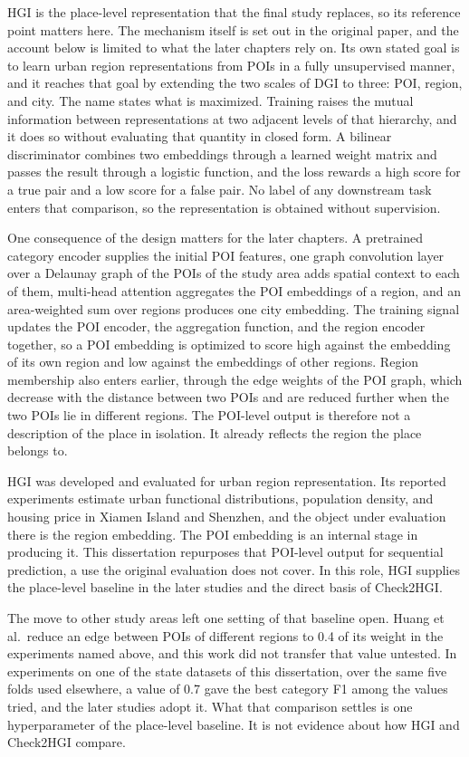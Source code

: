 HGI is the place-level representation that the final study replaces, so its reference
point matters here. The mechanism itself is set out in the original paper, and the
account below is limited to what the later chapters rely on. Its own stated goal is to
learn urban region representations from POIs in a fully unsupervised manner, and it
reaches that goal by extending the two scales of DGI to three: POI, region, and city.
The name states what is maximized. Training raises the mutual information between
representations at two adjacent levels of that hierarchy, and it does so without
evaluating that quantity in closed form. A bilinear discriminator combines two
embeddings through a learned weight matrix and passes the result through a logistic
function, and the loss rewards a high score for a true pair and a low score for a
false pair. No label of any downstream task enters that comparison, so the
representation is obtained without supervision.

One consequence of the design matters for the later chapters. A pretrained category
encoder supplies the initial POI features, one graph convolution layer over a Delaunay
graph of the POIs of the study area adds spatial context to each of them, multi-head
attention aggregates the POI embeddings of a region, and an area-weighted sum over
regions produces one city embedding. The training signal updates the POI encoder, the
aggregation function, and the region encoder together, so a POI embedding is optimized
to score high against the embedding of its own region and low against the embeddings
of other regions. Region membership also enters earlier, through the edge weights of
the POI graph, which decrease with the distance between two POIs and are reduced
further when the two POIs lie in different regions. The POI-level output is therefore
not a description of the place in isolation. It already reflects the region the place
belongs to.

HGI was developed and evaluated for urban region representation. Its reported
experiments estimate urban functional distributions, population density, and housing
price in Xiamen Island and Shenzhen, and the object under evaluation there is the
region embedding. The POI embedding is an internal stage in producing it. This
dissertation repurposes that POI-level output for sequential prediction, a use the
original evaluation does not cover. In this role, HGI supplies the place-level
baseline in the later studies and the direct basis of Check2HGI.

The move to other study areas left one setting of that baseline open. Huang et al.\
reduce an edge between POIs of different regions to 0.4 of its weight in the
experiments named above, and this work did not transfer that value untested. In
experiments on one of the state datasets of this dissertation, over the same five
folds used elsewhere, a value of 0.7 gave the best category F1 among the values tried,
and the later studies adopt it. What that comparison settles is one hyperparameter of
the place-level baseline. It is not evidence about how HGI and Check2HGI compare.

